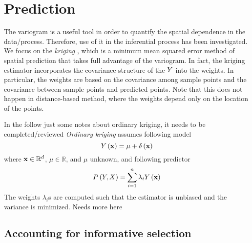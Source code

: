 \section{Prediction}
The variogram is a useful tool in order to quantify the spatial dependence in the data/process. Therefore, use of it in the inferential process has been investigated. We focus on the \emph{kriging} {\color{red} \citep{matheron1962traite}}, which is a minimum mean squared error method of spatial prediction that takes full advantage of the variogram. In fact, the kriging estimator incorporates the covariance structure of the $Y$ into the weights. In particular, the weights are based on the covariance among sample points and the covariance between sample points and predicted points. Note that this does not happen in distance-based method, where the weights depend only on the location of the points.

{\color{red} In the follow just some notes about ordinary kriging, it needs to be completed/reviewed}
\emph{Ordinary kriging} assumes following model
\begin{equation}
Y\left(\mathbf{x}\right)=\mu+\delta\left(\mathbf{x}\right)
\end{equation}
where $\mathbf{x}\in\mathbb{R}^{d}$, $\mu\in\mathbb{R}$, and $\mu$ unknown, and following predictor
\begin{equation}
P\left(Y,X\right)=\sum_{i=1}^{n}{\lambda_{i}Y\left(\mathbf{x}\right)}
\end{equation}
The weights $\lambda_{i}$s are computed such that the estimator is unbiased and the variance is minimized. {\color{red} Needs more here}


\subsection{Accounting for informative selection}